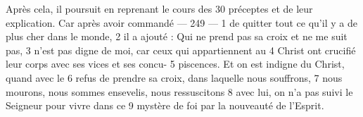 Après cela, il poursuit en reprenant le cours des	 
30	 	préceptes et de leur explication. Car après avoir commandé	 
 	--- 249 ---	 
1	 	de quitter tout ce qu'il y a de plus cher dans le monde,	 
2	 	il a ajouté : Qui ne prend pas sa croix et ne me suit pas,	 
3	 	n'est pas digne de moi, car ceux qui appartiennent au	 
4	 	Christ ont crucifié leur corps avec ses vices et ses concu-	 
5	 	piscences. Et on est indigne du Christ, quand avec le	 
6	 	refus de prendre sa croix, dans laquelle nous souffrons,	 
7	 	nous mourons, nous sommes ensevelis, nous ressuscitons	 
8	 	avec lui, on n'a pas suivi le Seigneur pour vivre dans ce	 
9	 	mystère de foi par la nouveauté de l'Esprit.